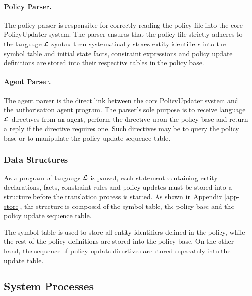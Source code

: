 \documentclass[11pt, twocolumn]{article}
\begin{document}
        \paragraph{Policy Parser.}

          The policy parser is responsible for correctly reading the policy
          file into the core PolicyUpdater system. The parser ensures that
          the policy file strictly adheres to the language $\cal{L}$ syntax
          then systematically stores entity identifiers into the symbol table
          and initial state facts, constraint expressions and policy update
          definitions are stored into their respective tables in the policy
          base.

        \paragraph{Agent Parser.}

          The agent parser is the direct link between the core PolicyUpdater
          system and the authorisation agent program. The parser's sole purpose
          is to receive language $\cal{L}$ directives from an agent, perform
          the directive upon the policy base and return a reply if the
          directive requires one. Such directives may be to query the policy
          base or to manipulate the policy update sequence table.

      \subsubsection{Data Structures}

        As a program of language ${\cal L}$ is parsed, each statement
        containing entity declarations, facts, constraint rules and policy
        updates must be stored into a structure before the translation process
        is started. As shown in Appendix \ref{app-store}, the structure is composed
        of the symbol table, the policy base and the policy update sequence
        table.

        The symbol table is used to store all entity identifiers defined in the
        policy, while the rest of the policy definitions are stored into the
        policy base. On the other hand, the sequence of policy update
        directives are stored separately into the update table.

    \subsection{System Processes}
\end{document}
